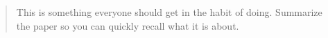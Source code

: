 \begin{framed}
\begin{quotation}
This is something everyone should get in the habit of doing. Summarize the paper so you can quickly recall what it is about. \cite{riboch}
\end{quotation}
\end{framed}